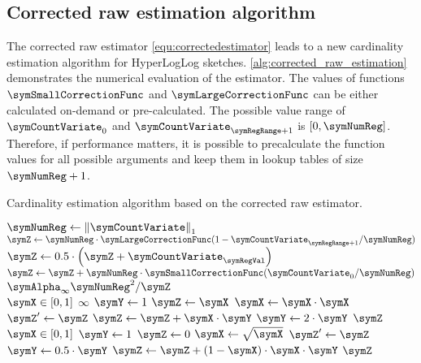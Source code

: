 \documentclass[a4paper]{scrartcl}
\begin{document}
\subsection{Corrected raw estimation algorithm}
The corrected raw estimator \eqref{equ:correctedestimator} leads to a new cardinality estimation algorithm for HyperLogLog sketches. \cref{alg:corrected_raw_estimation} demonstrates the numerical evaluation of the estimator. The values of functions $\symSmallCorrectionFunc$ and $\symLargeCorrectionFunc$ can be either calculated on-demand or pre-calculated. The possible value range of $\symCountVariate_0$ and $\symCountVariate_{\symRegRange+1}$ is $[0, \symNumReg]$. Therefore, if performance matters, it is possible to precalculate the function values for all possible arguments and keep them in lookup tables of size $\symNumReg+1$. 

\begin{algorithm}
\caption{Cardinality estimation algorithm based on the corrected raw estimator.}
\label{alg:corrected_raw_estimation}
\begin{algorithmic}
\State $\symNumReg \gets \left\Vert\boldsymbol{\symCountVariate}\right\Vert_1$
\State $\symZ\gets\symNumReg\cdot\symLargeCorrectionFunc(1 - \symCountVariate_{\symRegRange+1}/\symNumReg)$
\State $\symZ\gets0.5\cdot\left(\symZ + \symCountVariate_\symRegVal\right)$
\EndFor
\State $\symZ\gets\symZ+\symNumReg\cdot\symSmallCorrectionFunc(\symCountVariate_0/\symNumReg)$
\State \Return$\symAlpha_\infty\symNumReg^2 / \symZ$
\EndFunction
\\
\Function {$\symSmallCorrectionFunc$}{$\symX$}
\Comment $\symX\in[0,1]$
\State\Return$\infty$
\EndIf
\State $\symY\gets1$
\State $\symZ\gets\symX$
\Repeat
\State $\symX\gets\symX\cdot\symX$
\State $\symZ'\gets\symZ$
\State $\symZ\gets\symZ + \symX\cdot\symY$
\State $\symY\gets2\cdot\symY$
\State\Return$\symZ$
\EndFunction
\\
\Function {$\symLargeCorrectionFunc$}{$\symX$}
\Comment $\symX\in[0,1]$
\State $\symY\gets1$
\State $\symZ\gets0$
\Repeat
\State $\symX\gets\sqrt{\symX}$
\State $\symZ'\gets\symZ$
\State $\symY\gets0.5\cdot\symY$
\State $\symZ\gets\symZ + \left(1-\symX\right)\cdot\symX\cdot\symY$
\State\Return$\symZ$
\EndFunction
\end{algorithmic}
\end{algorithm}
\end{document}
